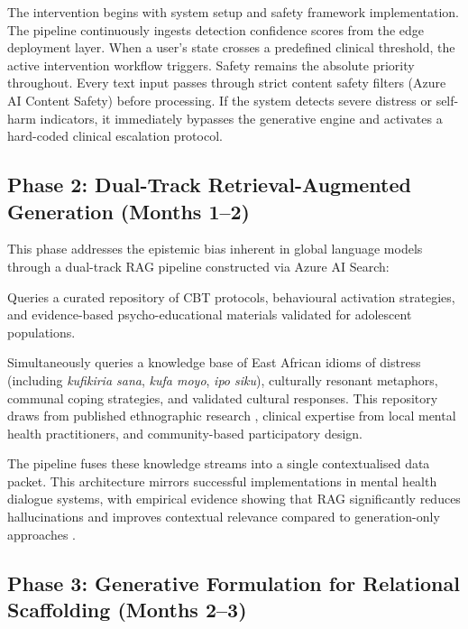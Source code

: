 \documentclass[12pt,a4paper]{article}
\begin{document}
The intervention begins with system setup and safety framework implementation. The pipeline continuously ingests detection confidence scores from the edge deployment layer. When a user's state crosses a predefined clinical threshold, the active intervention workflow triggers. Safety remains the absolute priority throughout. Every text input passes through strict content safety filters (Azure AI Content Safety) before processing. If the system detects severe distress or self-harm indicators, it immediately bypasses the generative engine and activates a hard-coded clinical escalation protocol.

\subsection{Phase 2: Dual-Track Retrieval-Augmented Generation (Months 1--2)}

This phase addresses the epistemic bias inherent in global language models through a dual-track RAG pipeline constructed via Azure AI Search:

\begin{description}[style=nextline]
  \item[Track A (Clinical Grounding)]
  Queries a curated repository of CBT protocols, behavioural activation strategies, and evidence-based psycho-educational materials validated for adolescent populations.

  \item[Track B (Cultural Translation)]
  Simultaneously queries a knowledge base of East African idioms of distress (including \textit{kufikiria sana}, \textit{kufa moyo}, \textit{ipo siku}), culturally resonant metaphors, communal coping strategies, and validated cultural responses. This repository draws from published ethnographic research \citep{Mendenhall2019}, clinical expertise from local mental health practitioners, and community-based participatory design.
\end{description}

The pipeline fuses these knowledge streams into a single contextualised data packet. This architecture mirrors successful implementations in mental health dialogue systems, with empirical evidence showing that RAG significantly reduces hallucinations and improves contextual relevance compared to generation-only approaches \citep{Kafi2026}.

\subsection{Phase 3: Generative Formulation for Relational Scaffolding (Months 2--3)}
\end{document}
